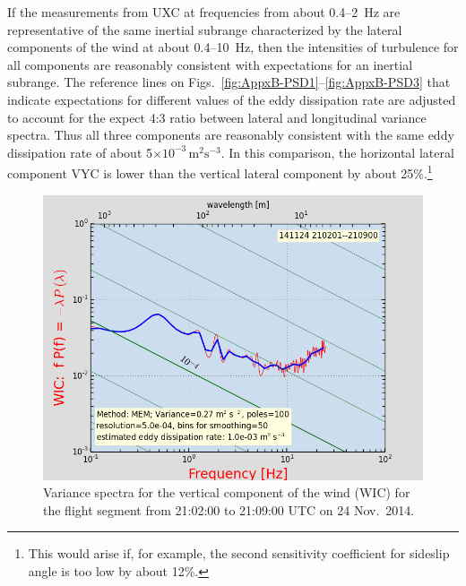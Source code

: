 \documentclass[12pt,twoside,english]{article}\usepackage[]{graphicx}\usepackage[]{color}
\let\OrgIndex\index
\renewcommand*{\index}[1]{\OrgIndex{#1}}
\begin{document}
{{If the measurements from UXC at frequencies from about 0.4--2~Hz are representative of the same inertial subrange characterized by the lateral components of the wind at about 0.4--10~Hz, then the intensities of turbulence for all components are reasonably consistent with expectations for an inertial subrange. The reference lines on Figs.~\ref{fig:AppxB-PSD1}--\ref{fig:AppxB-PSD3} that indicate expectations for different values of the eddy dissipation rate are adjusted to account for the expect 4:3 ratio between lateral and longitudinal variance spectra. Thus all three components are reasonably consistent with the same eddy dissipation rate of about 5$\times10^{-3}\,\mathrm{m}^{2}\mathrm{s}^{-3}$. In this comparison, the horizontal lateral component VYC is lower than the vertical lateral component by about 25\%.\footnote{This would arise if, for example, the second sensitivity coefficient for sideslip angle is too low by about 12\%.}





\begin{figure}
\noindent \begin{centering}
\includegraphics[height=0.4\textheight]{SpecialGraphics/PSD5.png}  
\par\end{centering}

\protect\protect\protect\caption{\label{fig:AppxB-PSD5}Variance spectra for the vertical component of the wind (WIC) for the flight segment from 21:02:00 to 21:09:00 UTC on 24 Nov.\ 2014.} 
\end{figure}

}}
\end{document}
